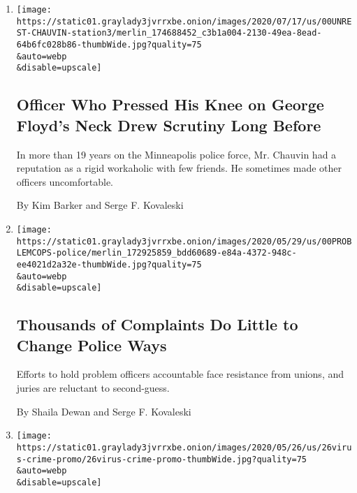 \begin{enumerate}
\def\labelenumi{\arabic{enumi}.}
\item
  \href{/2020/07/18/us/derek-chauvin-george-floyd.html}{}

  \texttt{[image: https://static01.graylady3jvrrxbe.onion/images/2020/07/17/us/00UNREST-CHAUVIN-station3/merlin\_174688452\_c3b1a004-2130-49ea-8ead-64b6fc028b86-thumbWide.jpg?quality=75\\\&auto=webp\\\&disable=upscale]}

  \hypertarget{officer-who-pressed-his-knee-on-george-floyds-neck-drew-scrutiny-long-before}{%
  \subsection{Officer Who Pressed His Knee on George Floyd's Neck Drew
  Scrutiny Long
  Before}\label{officer-who-pressed-his-knee-on-george-floyds-neck-drew-scrutiny-long-before}}

  In more than 19 years on the Minneapolis police force, Mr. Chauvin had
  a reputation as a rigid workaholic with few friends. He sometimes made
  other officers uncomfortable.

  By Kim Barker and Serge F. Kovaleski
\item
  \href{/2020/05/30/us/derek-chauvin-george-floyd.html}{}

  \texttt{[image: https://static01.graylady3jvrrxbe.onion/images/2020/05/29/us/00PROBLEMCOPS-police/merlin\_172925859\_bdd60689-e84a-4372-948c-ee4021d2a32e-thumbWide.jpg?quality=75\\\&auto=webp\\\&disable=upscale]}

  \hypertarget{thousands-of-complaints-do-little-to-change-police-ways}{%
  \subsection{Thousands of Complaints Do Little to Change Police
  Ways}\label{thousands-of-complaints-do-little-to-change-police-ways}}

  Efforts to hold problem officers accountable face resistance from
  unions, and juries are reluctant to second-guess.

  By Shaila Dewan and Serge F. Kovaleski
\item
  \href{/2020/05/26/us/coronavirus-crime.html}{}

  \texttt{[image: https://static01.graylady3jvrrxbe.onion/images/2020/05/26/us/26virus-crime-promo/26virus-crime-promo-thumbWide.jpg?quality=75\\\&auto=webp\\\&disable=upscale]}

  \hypertarget{a-pandemic-bright-spot-in-many-places-less-crime}{%
}
\end{enumerate}
